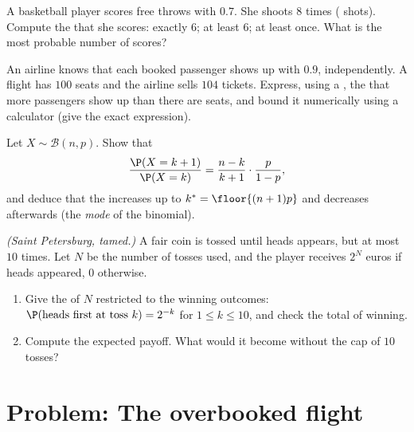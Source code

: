\begin{exercise}[$\star\star$]\label{exo:g12:randvar:5}
A basketball player scores free throws with  $0.7$. She shoots
$8$ times ( shots). Compute the  that she scores:
exactly $6$; at least $6$; at least once. What is the most probable number
of scores?
\end{exercise}

\begin{exercise}[$\star\star$]\label{exo:g12:randvar:6}
An airline knows that each booked passenger shows up with 
$0.9$, independently. A flight has $100$ seats and the airline sells $104$
tickets. Express, using a , the  that more
passengers show up than there are seats, and bound it numerically using a
calculator (give the exact expression).
\end{exercise}

\begin{exercise}[$\star\star$]\label{exo:g12:randvar:7}
Let $X \sim \mathcal B(n, p)$. Show that
\[
\frac{\P(X = k+1)}{\P(X = k)} = \frac{n-k}{k+1}\cdot\frac{p}{1-p},
\]
and deduce that the  increases up to
$k^* = \floor{(n+1)p}$ and decreases afterwards (the \emph{mode} of the
binomial).
\end{exercise}

\begin{exercise}[$\star\star\star$]\label{exo:g12:randvar:8}
\emph{(Saint Petersburg, tamed.)} A fair coin is tossed until heads
appears, but at most $10$ times. Let $N$ be the number of tosses used, and
the player receives $2^N$ euros if heads appeared, $0$ otherwise.
\begin{enumerate}
  \item Give the  of $N$ restricted to the winning outcomes:
        $\P(\text{heads first at toss } k) = 2^{-k}$ for
        $1 \leq k \leq 10$, and check the total  of winning.
  \item Compute the expected payoff. What would it become without the cap
        of $10$ tosses?
\end{enumerate}
\end{exercise}

\section{Problem: The overbooked flight}

